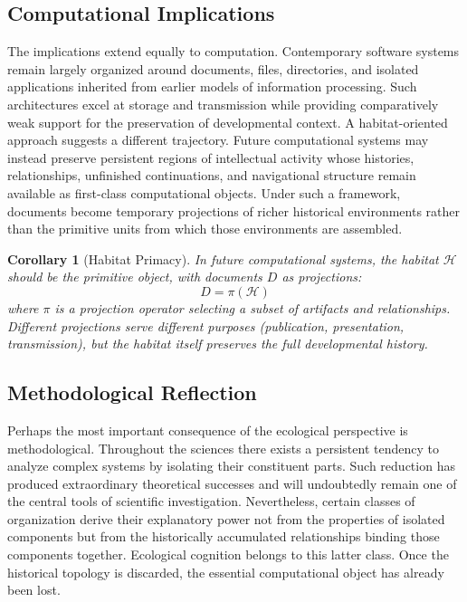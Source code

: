 \documentclass[12pt,oneside]{article}
\newtheorem{corollary}[definition]{Corollary}
\theoremstyle{remark}
\begin{document}
\subsection{Computational Implications}

The implications extend equally to computation. Contemporary software systems remain largely organized around documents, files, directories, and isolated applications inherited from earlier models of information processing. Such architectures excel at storage and transmission while providing comparatively weak support for the preservation of developmental context. A habitat-oriented approach suggests a different trajectory. Future computational systems may instead preserve persistent regions of intellectual activity whose histories, relationships, unfinished continuations, and navigational structure remain available as first-class computational objects. Under such a framework, documents become temporary projections of richer historical environments rather than the primitive units from which those environments are assembled.

\begin{corollary}[Habitat Primacy]
In future computational systems, the habitat \(\mathcal{H}\) should be the primitive object, with documents \(D\) as projections:
\[
D = \pi(\mathcal{H})
\]
where \(\pi\) is a projection operator selecting a subset of artifacts and relationships. Different projections serve different purposes (publication, presentation, transmission), but the habitat itself preserves the full developmental history.
\end{corollary}

\subsection{Methodological Reflection}

Perhaps the most important consequence of the ecological perspective is methodological. Throughout the sciences there exists a persistent tendency to analyze complex systems by isolating their constituent parts. Such reduction has produced extraordinary theoretical successes and will undoubtedly remain one of the central tools of scientific investigation. Nevertheless, certain classes of organization derive their explanatory power not from the properties of isolated components but from the historically accumulated relationships binding those components together. Ecological cognition belongs to this latter class. Once the historical topology is discarded, the essential computational object has already been lost.
\end{document}
